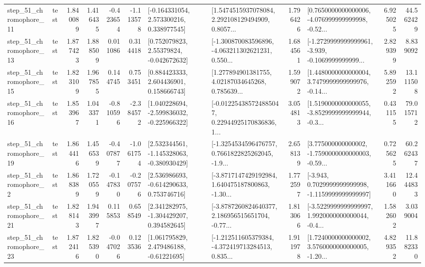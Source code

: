 \begin{tabular}{llrrrrllrlrr}
   step\_51\_chromophore\_11 &      test &      1.840089 &    1.416435 &     -0.423654 & -1.113578 &    [-0.164331054, 2.573300216, 0.338977545] &  [1.5474515937078084, 2.292108129494909, 0.8057... &       1.796426 &  [0.7650000000000006, -4.076999999999998, -0.52... &            6.925025 &         44.562429 \\
   step\_51\_chromophore\_13 &      test &      1.877423 &    1.888509 &      0.011086 &  0.314418 &     [0.752079823, 2.55379824, -0.042672632] &  [-1.300870083596896, -4.063211302621231, 0.550... &       1.684561 &  [-1.2729999999999961, -3.939, -0.1069999999999... &            2.829399 &          8.839092 \\
   step\_51\_chromophore\_15 &      test &      1.823109 &    1.967855 &      0.144745 &  0.753451 &     [0.884423333, 2.604436901, 0.158666743] &  [1.277894901381755, 4.02187034645268, 0.785639... &       1.599072 &  [1.4480000000000004, 3.7479999999999976, -0.14... &            5.892592 &         13.111508 \\
   step\_51\_chromophore\_16 &      test &      1.853967 &    1.043371 &     -0.810596 & -2.384572 &   [1.040228694, -2.599836032, -0.225966322] &  [-0.012254385724885047, 0.22944925170836836, 1... &       3.054813 &  [1.5190000000000055, -3.8529999999999944, -0.3... &            0.431155 &         79.015712 \\
   step\_51\_chromophore\_19 &      test &      1.864416 &    1.456539 &     -0.407877 & -1.061754 &   [2.532344561, -1.145328063, -0.380930429] &  [-1.3254534596476757, 0.7661822825262045, -1.9... &       2.658139 &  [3.775000000000002, -1.7590000000000003, -0.59... &            0.725625 &         60.262437 \\
    step\_51\_chromophore\_2 &      test &      1.868389 &    1.720559 &     -0.147830 & -0.207576 &    [2.536986693, -0.614290633, 0.753746716] &  [-3.8717147429192984, 1.640475187800863, -1.30... &       1.772597 &  [-3.943, 0.7029999999999998, -1.1159999999999997] &            3.411660 &         12.444833 \\
   step\_51\_chromophore\_21 &      test &      1.828143 &    1.943997 &      0.115853 &  0.658549 &    [2.341282975, -1.304429207, 0.394582645] &  [-3.8787260824640377, 2.186956515651704, -0.77... &       1.813066 &  [-3.5229999999999997, 1.9920000000000044, -0.4... &            1.582602 &          3.039004 \\
   step\_51\_chromophore\_23 &      test &      1.872416 &    1.825390 &     -0.047026 &  0.123536 &     [1.061795829, 2.479486188, -0.61221695] &  [-1.212511605379384, -4.372419713284513, 0.835... &       1.911978 &  [1.7240000000000002, 3.5760000000000005, -1.20... &            4.829352 &         11.882330 \\

\end{tabular}
